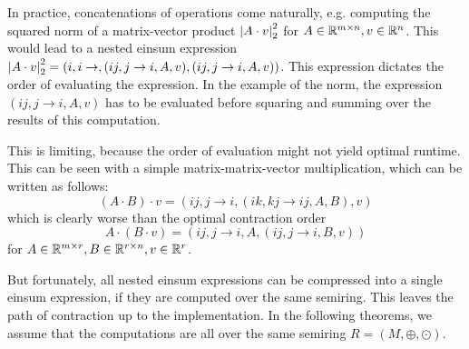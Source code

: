In practice, concatenations of operations come naturally, e.g. computing the squared norm of a matrix-vector product $\left| A \cdot v \right|_2^2$
for $A \in \mathbb{R}^{m \times n}, v \in \mathbb{R}^n$.
This would lead to a nested einsum expression $\left| A \cdot v \right|_2^2 = (i,i \rightarrow , (ij, j \rightarrow i, A, v), (ij, j \rightarrow i, A, v))$.
This expression dictates the order of evaluating the expression.
In the example of the norm, the expression $(ij, j \rightarrow i, A, v)$ has to be evaluated before squaring and summing over the results of this computation.

This is limiting, because the order of evaluation might not yield optimal runtime.
This can be seen with a simple matrix-matrix-vector multiplication, which can be written as follows:
$$(A \cdot B) \cdot v = (ij, j \rightarrow i, (ik, kj \rightarrow ij, A, B), v)$$
which is clearly worse than the optimal contraction order
$$A \cdot (B \cdot v) = (ij, j \rightarrow i, A, (ij, j \rightarrow i, B, v))$$
for $A \in \mathbb{R}^{m \times r}, B \in \mathbb{R}^{r \times n}, v \in \mathbb{R}^r$.

But fortunately, all nested einsum expressions can be compressed into a single einsum expression, if they are computed over the same semiring.
This leaves the path of contraction up to the implementation.
In the following theorems, we assume that the computations are all over the same semiring $R = (M, \oplus, \odot)$.

